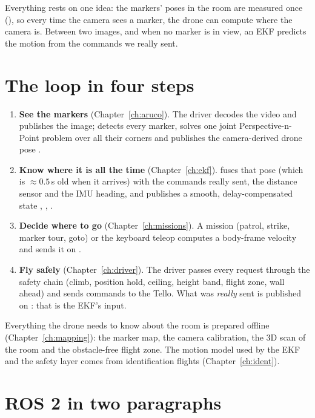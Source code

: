 \begin{keypoint}
Everything rests on one idea: the markers' poses in the room are measured once (), so
every time the camera sees a marker, the drone can compute where the camera is. Between two images, and when no
marker is in view, an EKF predicts the motion from the commands we really sent.
\end{keypoint}

\section{The loop in four steps}

\begin{enumerate}[leftmargin=*]
\item \textbf{See the markers} (Chapter~\ref{ch:aruco}). The driver decodes the video and publishes the image;
   detects every marker, solves one joint Perspective-n-Point problem over all their corners
  and publishes the camera-derived drone pose .
\item \textbf{Know where it is all the time} (Chapter~\ref{ch:ekf}).  fuses that pose (which is
  $\approx 0.5$\,s old when it arrives) with the commands really sent, the distance sensor and the IMU heading,
  and publishes a smooth, delay-compensated state , , .
\item \textbf{Decide where to go} (Chapter~\ref{ch:missions}). A mission (patrol, strike, marker tour, goto) or the
  keyboard teleop computes a body-frame velocity and sends it on .
\item \textbf{Fly safely} (Chapter~\ref{ch:driver}). The driver passes every request through the safety chain
  (climb, position hold, ceiling, height band, flight zone, wall ahead) and sends  commands to the Tello.
  What was \emph{really} sent is published on : that is the EKF's input.
\end{enumerate}

Everything the drone needs to know about the room is prepared offline (Chapter~\ref{ch:mapping}): the marker map,
the camera calibration, the 3D scan of the room and the obstacle-free flight zone. The motion model used by the EKF
and the safety layer comes from identification flights (Chapter~\ref{ch:ident}).

\section{ROS 2 in two paragraphs}

